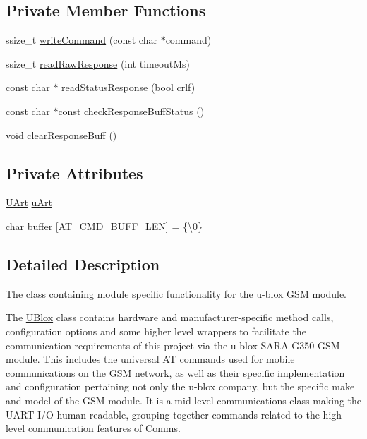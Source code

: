 \subsection*{Private Member Functions}
\begin{DoxyCompactItemize}
\item 
ssize\+\_\+t \hyperlink{class_u_blox_af604d1897a66192bf1c2a11997f2634d}{write\+Command} (const char $\ast$command)
\item 
ssize\+\_\+t \hyperlink{class_u_blox_ab4a7ab4b8922d91e23f273ae160c1bed}{read\+Raw\+Response} (int timeout\+Ms)
\item 
const char $\ast$ \hyperlink{class_u_blox_a4eaca5b1b1c4b5b6f6164b220dd43e0b}{read\+Status\+Response} (bool crlf)
\item 
const char $\ast$const \hyperlink{class_u_blox_aab6ad68e4c7522278f19ceab1dc2a58d}{check\+Response\+Buff\+Status} ()
\item 
void \hyperlink{class_u_blox_afc846fbcb1cbd49057b5ce39cd0e0dd6}{clear\+Response\+Buff} ()
\end{DoxyCompactItemize}
\subsection*{Private Attributes}
\begin{DoxyCompactItemize}
\item 
\hyperlink{class_u_art}{U\+Art} \hyperlink{class_u_blox_a034c0463d1c199d094d657c8ebb151e8}{u\+Art}
\item 
char \hyperlink{class_u_blox_a6ca4b90f3dc4e856181dce1ebda6f82c}{buffer} \mbox{[}\hyperlink{_u_blox_8h_aad458adf8f40cbcc1074061f226a112e}{A\+T\+\_\+\+C\+M\+D\+\_\+\+B\+U\+F\+F\+\_\+\+L\+EN}\mbox{]} = \{\textquotesingle{}\textbackslash{}0\textquotesingle{}\}
\end{DoxyCompactItemize}


\subsection{Detailed Description}
The class containing module specific functionality for the u-\/blox G\+SM module. 

The \hyperlink{class_u_blox}{U\+Blox} class contains hardware and manufacturer-\/specific method calls, configuration options and some higher level wrappers to facilitate the communication requirements of this project via the u-\/blox S\+A\+R\+A-\/\+G350 G\+SM module. This includes the universal AT commands used for mobile communications on the G\+SM network, as well as their specific implementation and configuration pertaining not only the u-\/blox company, but the specific make and model of the G\+SM module. It is a mid-\/level communications class making the U\+A\+RT I/O human-\/readable, grouping together commands related to the high-\/level communication features of \hyperlink{class_comms}{Comms}.

